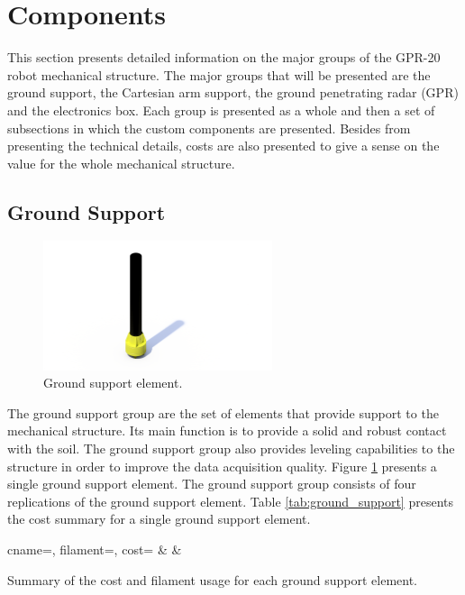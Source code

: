 \documentclass{article}
\begin{document}
\newpage
\section{Components} \label{sec:components}
This section presents detailed information on the major groups of the GPR-20 robot mechanical structure. The major groups that will be presented are the ground support, the Cartesian arm support, the ground penetrating radar (GPR) and the electronics box. Each group is presented as a whole and then a set of subsections in which the custom components are presented. Besides from presenting the technical details, costs are also presented to give a sense on the value for the whole mechanical structure.

\subsection{Ground Support}

\begin{figure}[h]
    \centering
    \includegraphics[width=0.6\textwidth]{images/ground.png}
    \caption{Ground support element.}
    \label{fig:ground_support_element}
\end{figure}

The ground support group are the set of elements that provide support to the mechanical structure. Its main function is to provide a solid and robust contact with the soil. The ground support group also provides leveling capabilities to the structure in order to improve the data acquisition quality. Figure \ref{fig:ground_support_element} presents a single ground support element. The ground support group consists of four replications of the ground support element. Table \ref{tab:ground_support} presents the cost summary for a single ground support element.

\begin{table}[h]
    \centering
    {cname=\cname, filament=\filament, cost=\cost}%
    {\cname & \filament & \cost}%
    \caption{Summary of the cost and filament usage for each ground support element.}
    \label{tab:ground_support}
\end{table}
\end{document}
